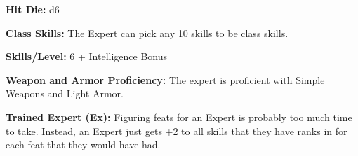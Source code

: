 


\textbf{Hit Die:} d6

\textbf{Class Skills:} The Expert can pick any 10 skills to be class skills.

\textbf{Skills/Level:} 6 + Intelligence Bonus

\modebab
\poorfor
\poorref
\goodwil

\begin{classtable}
\leveltwo{}
\levelthree{}
\levelfour{}
\levelfive{}
\end{classtable}

\classfeatures

\textbf{Weapon and Armor Proficiency:} The expert is proficient with Simple Weapons and Light Armor.

\textbf{Trained Expert (Ex):} Figuring feats for an Expert is probably too much time to take. Instead, an Expert just gets +2 to all skills that they have ranks in for each feat that they would have had.